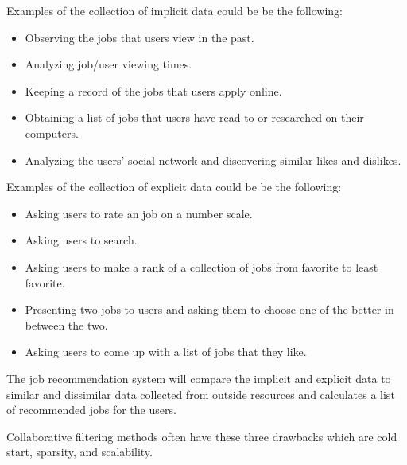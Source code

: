 \documentclass[sigconf]{acmart}
\begin{document}
\par Examples of the collection of implicit data could be be the following:

\begin{itemize}
  \item Observing the jobs that users view in the past.
  \item Analyzing job/user viewing times.
  \item Keeping a record of the jobs that users apply online.
  \item Obtaining a list of jobs that users have read to or researched on their computers.
  \item Analyzing the users' social network and discovering similar likes and dislikes.
\end{itemize}


\par Examples of the collection of explicit data could be be the following:
 
\begin{itemize}
  \item Asking users to rate an job on a number scale.
  \item Asking users to search.
  \item Asking users to make a rank of a collection of jobs from favorite to least favorite.
  \item Presenting two jobs to users and asking them to choose one of the better in between the two.
  \item Asking  users to come up with a list of jobs that they like.
\end{itemize}

\par The job recommendation system will compare the implicit and explicit data to similar and dissimilar data collected from outside resources and calculates a list of recommended jobs for the users. 

\par Collaborative filtering methods often have these three drawbacks which are cold start, sparsity, and scalability.\cite{Standford}
\end{document}
